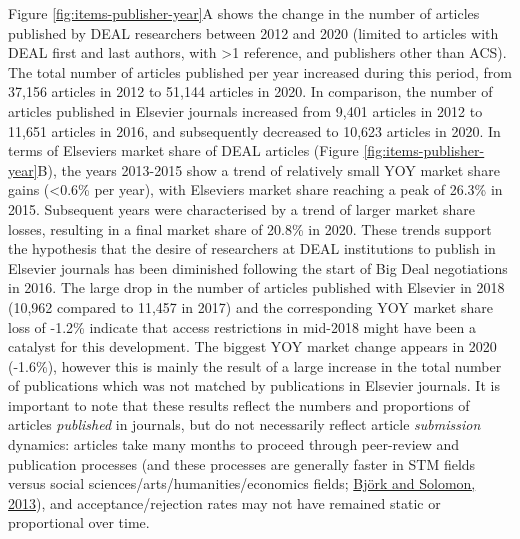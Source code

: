 \documentclass[
]{article}
\begin{document}
Figure \ref{fig:items-publisher-year}A shows the change in the number of articles published by DEAL researchers between 2012 and 2020 (limited to articles with DEAL first and last authors, with \textgreater1 reference, and publishers other than ACS). The total number of articles published per year increased during this period, from 37,156 articles in 2012 to 51,144 articles in 2020. In comparison, the number of
articles published in Elsevier journals increased from 9,401 articles in 2012 to 11,651 articles in 2016, and subsequently decreased to 10,623 articles in 2020. In terms of Elsevier\textquotesingle s market share of DEAL articles (Figure \ref{fig:items-publisher-year}B), the years 2013-2015 show a trend of relatively small YOY market share gains (\textless0.6\% per year), with Elsevier\textquotesingle s market share reaching a peak of 26.3\% in 2015. Subsequent years were characterised by a trend of larger market share losses, resulting in a final market share of 20.8\% in 2020. These trends support the hypothesis that the desire of researchers at DEAL institutions to publish in Elsevier journals has been diminished following the start of Big Deal negotiations in 2016. The large drop in the number of articles published with Elsevier in 2018 (10,962 compared to 11,457 in 2017) and the corresponding YOY market share loss of -1.2\% indicate that access restrictions in mid-2018 might have been a catalyst for this development. The biggest YOY market change appears in 2020 (-1.6\%), however this is mainly the result of a large increase in the total number of publications which was not matched by publications in Elsevier journals. It is important to note that these results reflect the numbers and proportions of articles \emph{published} in journals, but do not necessarily reflect article \emph{submission} dynamics: articles take many months to proceed through peer-review and publication processes (and these processes are generally faster in STM fields versus social sciences/arts/humanities/economics fields; \href{https://doi.org/10.1016/j.joi.2013.09.001}{Björk and Solomon, 2013}), and acceptance/rejection rates may not have remained static or proportional over time.
\end{document}
